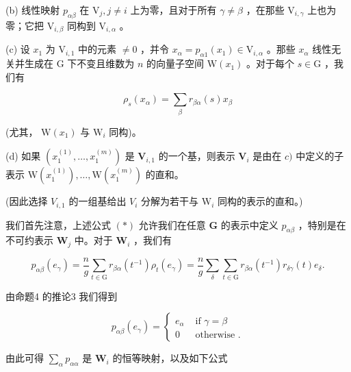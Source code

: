 \documentclass[10pt]{article}
\begin{document}
(b) 线性映射 \({p}_{\alpha \beta }\) 在 \({\mathrm{V}}_{j},j \neq  i\) 上为零，且对于所有 \(\gamma  \neq  \beta\) ，在那些 \({\mathrm{V}}_{i,\gamma }\) 上也为零；它把 \({\mathrm{V}}_{i,\beta }\) 同构到 \({\mathrm{V}}_{i,\alpha }\) 。

(c) 设 \({x}_{1}\) 为 \({\mathrm{V}}_{i,1}\) 中的元素 \(\neq  0\) ，并令 \({x}_{\alpha } = {p}_{\alpha 1}\left( {x}_{1}\right)  \in  {\mathrm{V}}_{i,\alpha }\) 。那些 \({x}_{\alpha }\) 线性无关并生成在 \(\mathrm{G}\) 下不变且维数为 \(n\) 的向量子空间 \(\mathrm{W}\left( {x}_{1}\right)\) 。对于每个 \(s \in  \mathrm{G}\) ，我们有

\[
{\rho }_{s}\left( {x}_{\alpha }\right)  = \mathop{\sum }\limits_{\beta }{r}_{\beta \alpha }\left( s\right) {x}_{\beta }
\]

(尤其， \(\mathrm{W}\left( {x}_{1}\right)\) 与 \({\mathrm{W}}_{i}\) 同构)。

(d) 如果 \(\left( {{x}_{1}^{\left( 1\right) },\ldots ,{x}_{1}^{\left( m\right) }}\right)\) 是 \({\mathbf{V}}_{i,1}\) 的一个基，则表示 \({\mathbf{V}}_{i}\) 是由在 \(c)\) 中定义的子表示 \(\mathrm{W}\left( {x}_{1}^{\left( 1\right) }\right) ,\ldots ,\mathrm{W}\left( {x}_{1}^{\left( m\right) }\right)\) 的直和。

(因此选择 \({V}_{i,1}\) 的一组基给出 \({V}_{i}\) 分解为若干与 \({\mathrm{W}}_{i}\) 同构的表示的直和。)

我们首先注意，上述公式 \(\left( *\right)\) 允许我们在任意 \(\mathbf{G}\) 的表示中定义 \({p}_{\alpha \beta }\) ，特别是在不可约表示 \({\mathbf{W}}_{j}\) 中。对于 \({\mathbf{W}}_{i}\) ，我们有

\[
{p}_{\alpha \beta }\left( {e}_{\gamma }\right)  = \frac{n}{g}\mathop{\sum }\limits_{{t \in  \mathrm{G}}}{r}_{\beta \alpha }\left( {t}^{-1}\right) {\rho }_{t}\left( {e}_{\gamma }\right)  = \frac{n}{g}\mathop{\sum }\limits_{\delta }\mathop{\sum }\limits_{{t \in  \mathrm{G}}}{r}_{\beta \alpha }\left( {t}^{-1}\right) {r}_{\delta \gamma }\left( t\right) {e}_{\delta }.
\]

由命题4 的推论3 我们得到

\[
{p}_{\alpha \beta }\left( {e}_{\gamma }\right)  = \left\{  \begin{array}{ll} {e}_{\alpha } & \text{ if }\gamma  = \beta \\  0 & \text{ otherwise }. \end{array}\right.
\]

由此可得 \(\mathop{\sum }\limits_{\alpha }{p}_{\alpha \alpha }\) 是 \({\mathbf{W}}_{i}\) 的恒等映射，以及如下公式
\end{document}
